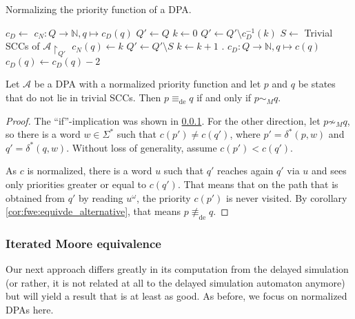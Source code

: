 \begin{algorithm}
  \caption{Normalizing the priority function of a DPA.}
  \label{alg:fwe:normalize_c}
  \begin{algorithmic}[1]
      \State $c_D \gets $
      \State $c_N : Q \rightarrow \mathbb{N}, q \mapsto c_D(q)$
      \State $Q' \gets Q$
      \State $k \gets 0$
        \State $Q' \gets Q' \setminus c_D^{-1}(k)$
        \State $S \gets $ Trivial SCCs of $\mathcal{A}\upharpoonright_{Q'}$
          \State $c_N(q) \gets k$
        \EndFor
        \State $Q' \gets Q' \setminus S$
        \State $k \gets k+1$
      \EndWhile
      \State {}
    \EndFunction
    \Statex
      .
      \State $c_D : Q \rightarrow \mathbb{N}, q \mapsto c(q)$
            \State $c_D(q) \gets c_D(q) - 2$
          \EndFor
        \EndWhile
      \EndFor
      \State {}
    \EndFunction
  \end{algorithmic}
\end{algorithm}


\begin{lem}
	Let $\mathcal{A}$ be a DPA with a normalized priority function and let $p$ and $q$ be states that do not lie in trivial SCCs. Then $p \equiv_\text{de} q$ if and only if $p \sim_M q$.
\end{lem}

\begin{proof}
	The \enquote{if}-implication was shown in \ref{}. For the other direction, let $p \not\sim_M q$, so there is a word $w \in \Sigma^*$ such that $c(p') \neq c(q')$, where $p' = \delta^*(p, w)$ and $q' = \delta^*(q, w)$. Without loss of generality, assume $c(p') < c(q')$.
	
	As $c$ is normalized, there is a word $u$ such that $q'$ reaches again $q'$ via $u$ and sees only priorities greater or equal to $c(q')$. That means that on the path that is obtained from $q'$ by reading $u^\omega$, the priority $c(p')$ is never visited. By corollary \ref{cor:fwe:equivde_alternative}, that means $p \not\equiv_\text{de} q$.
\end{proof}


\subsubsection{Iterated Moore equivalence}
Our next approach differs greatly in its computation from the delayed simulation (or rather, it is not related at all to the delayed simulation automaton anymore) but will yield a result that is at least as good. As before, we focus on normalized DPAs here.

